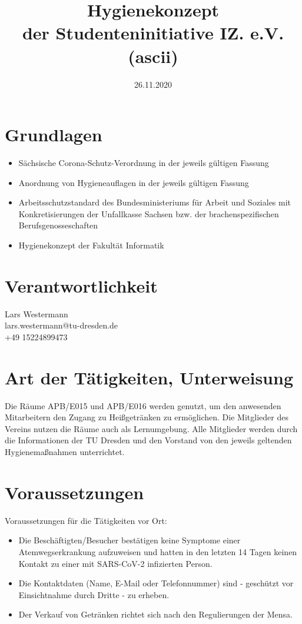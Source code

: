 \documentclass[12pt]{article}
\title{Hygienekonzept\\der Studenteninitiative IZ. e.V. (ascii)}
\date{26.11.2020}
\author{}
\makeatletter
\newcommand*{\responsibleName}{Lars Westermann}
\newcommand*{\responsibleMail}{lars.westermann@tu-dresden.de}
\newcommand*{\responsiblePhone}{+49 15224899473}
\makeatother
\begin{document}
    \maketitle

    \section*{Grundlagen}

        \begin{itemize}
            \item Sächsische Corona-Schutz-Verordnung in der jeweils gültigen Fassung
            \item Anordnung von Hygieneauflagen in der jeweils gültigen Fassung
            \item Arbeitsschutzstandard des Bundesministeriums für Arbeit und Soziales mit Konkretisierungen der Unfallkasse Sachsen bzw. der brachenspezifischen Berufsgenosseschaften
            \item Hygienekonzept der Fakultät Informatik
        \end{itemize}

    \section*{Verantwortlichkeit}
        \responsibleName \\
        \responsibleMail \\
        \responsiblePhone

    \section{Art der Tätigkeiten, Unterweisung}
        Die Räume APB/E015 und APB/E016 werden genutzt, um den anwesenden Mitarbeitern den Zugang zu Heißgetränken zu ermöglichen.
        Die Mitglieder des Vereins nutzen die Räume auch als Lernumgebung.
        Alle Mitglieder werden durch die Informationen der TU Dresden und den Vorstand von den jeweils geltenden Hygienemaßnahmen unterrichtet.

    \section{Voraussetzungen}
        Voraussetzungen für die Tätigkeiten vor Ort:
        \begin{itemize}
            \item Die Beschäftigten/Besucher bestätigen keine Symptome einer Atemwegserkrankung aufzuweisen und hatten in den letzten 14 Tagen keinen Kontakt zu einer mit SARS-CoV-2 infizierten Person.
            \item Die Kontaktdaten (Name, E-Mail oder Telefonnummer) sind - geschützt vor Einsichtnahme durch Dritte - zu erheben.
            \item Der Verkauf von Getränken richtet sich nach den Regulierungen der Mensa.
        \end{itemize}
\end{document}
